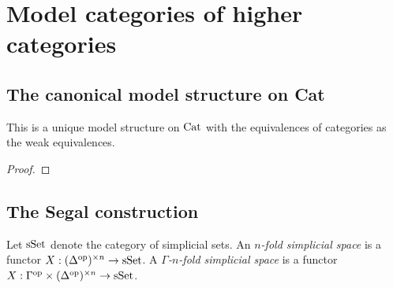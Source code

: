 \documentclass[a4paper]{amsart}
\begin{document}
\section{Model categories of higher categories}

\subsection{The canonical model structure on Cat}


\begin{theorem}
	This is a unique model structure on $\mathrm{Cat}$ with the equivalences of categories as the weak equivalences. 
\end{theorem}

\begin{proof}
\end{proof}


\subsection{The Segal construction} \label{sec-SegalConstruction}



\begin{definition}
	Let $\mathrm{sSet}$ denote the category of simplicial sets. An {\em $n$-fold simplicial space} is a functor $X: (\Delta^\textrm{op})^{\times n} \to \mathrm{sSet}$. A {\em $\Gamma$-$n$-fold simplicial space} is a functor $X: \Gamma^\textrm{op} \times (\Delta^\textrm{op})^{\times n} \to \mathrm{sSet}$.
\end{definition}
\end{document}
